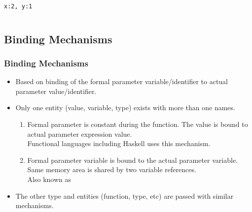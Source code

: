 \begin{frame}[fragile]
\begin{columns}
\begin{column}{.45\linewidth}
{\ \\
\texttt{x:2, y:1}\\}
\end{column}
\end{columns}
\end{frame}

\subsection{Binding Mechanisms}
\begin{frame}
\frametitle{Binding Mechanisms}
 \begin{itemize}
  \item  Based on binding of the formal parameter variable/identifier to actual parameter
value/identifier.
  \item Only one entity (value, variable, type) exists with more than one names.
\begin{enumerate}
  \item {} Formal parameter is constant during the function. The
value is bound to actual parameter expression value. \\
  Functional languages including Haskell uses this mechanism.
  \item {} Formal parameter variable is bound to the actual
parameter variable. Same memory area is shared by two variable references.\\
  Also known as  \\
\end{enumerate}
  \item The other type and entities (function, type, etc) are passed with similar mechanisms. 
\end{itemize}
\end{frame}


